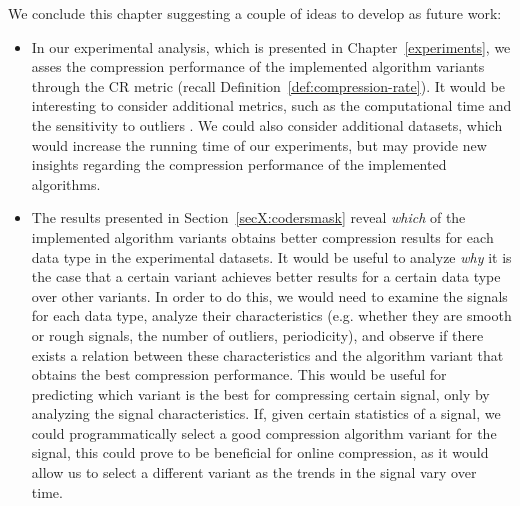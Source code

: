 

We conclude this chapter suggesting a couple of ideas to develop as future work:

\vspace{-5pt}

\begin{itemize}

\item In our experimental analysis, which is presented in Chapter~\ref{experiments}, we asses the compression performance of the implemented algorithm variants through the CR metric (recall Definition~\ref{def:compression-rate}). It would be interesting to consider additional metrics, such as the computational time and the sensitivity to outliers \cite{AnEva2013}. We could also consider additional datasets, which would increase the running time of our experiments, but may provide new insights regarding the compression performance of the implemented algorithms.

\item The results presented in Section~\ref{secX:codersmask} reveal \textit{which} of the implemented algorithm variants obtains better compression results for each data type in the experimental datasets. It would be useful to analyze \textit{why} it is the case that a certain variant achieves better results for a certain data type over other variants. In order to do this, we would need to examine the signals for each data type, analyze their characteristics (e.g. whether they are smooth or rough signals, the number of outliers, periodicity), and observe if there exists a relation between these characteristics and the algorithm variant that obtains the best compression performance. This would be useful for predicting which variant is the best for compressing certain signal, only by analyzing the signal characteristics. If, given certain statistics of a signal, we could programmatically select a good compression algorithm variant for the signal, this could prove to be beneficial for online compression, as it would allow us to select a different variant as the trends in the signal vary over time.

\end{itemize}

